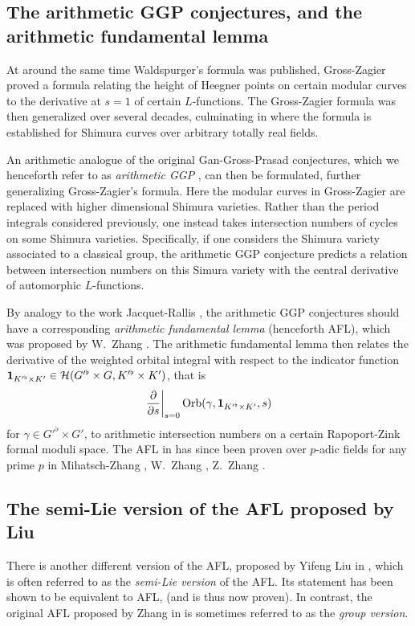 \subsection{The arithmetic GGP conjectures, and the arithmetic fundamental lemma}
At around the same time Waldspurger's formula was published,
Gross-Zagier \cite{ref:gross_zagier} proved a formula
relating the height of Heegner points
on certain modular curves to the derivative at $s=1$ of certain $L$-functions.
The Gross-Zagier formula was then generalized over several decades,
culminating in \cite{ref:GZshimura} where the formula is established
for Shimura curves over arbitrary totally real fields.

An arithmetic analogue of the original Gan-Gross-Prasad conjectures,
which we henceforth refer to as \emph{arithmetic GGP} \cite{ref:GGP},
can then be formulated, further generalizing Gross-Zagier's formula.
Here the modular curves in Gross-Zagier
are replaced with higher dimensional Shimura varieties.
Rather than the period integrals considered previously,
one instead takes intersection numbers of cycles on some Shimura varieties.
Specifically, if one considers the Shimura variety associated to a classical group,
the arithmetic GGP conjecture predicts a relation between intersection numbers
on this Simura variety with the central derivative of automorphic $L$-functions.

By analogy to the work Jacquet-Rallis \cite{ref:JR},
the arithmetic GGP conjectures should have a corresponding
\emph{arithmetic fundamental lemma} (henceforth AFL),
which was proposed by W.\ Zhang \cite[Conjecture 2.9]{ref:AFL}.
The arithmetic fundamental lemma then relates the derivative
of the weighted orbital integral with respect to the indicator function
$\mathbf{1}_{K'^\flat \times K'} \in \mathcal H(G'^\flat \times G, K'^\flat \times K')$, that is
\[ \left. \pdv{}{s} \right\rvert_{s=0} \operatorname{Orb}(\gamma, \mathbf{1}_{K'^\flat \times K'}, s) \]
for $\gamma \in G'^\flat \times G'$,
to arithmetic intersection numbers on a certain Rapoport-Zink formal moduli space.
The AFL in \cite{ref:AFL} has since been proven over $p$-adic fields for any prime $p$ in
Mihatsch-Zhang \cite{ref:MZ2021}, W.\ Zhang \cite{ref:Wei2021}, Z.\ Zhang \cite{ref:Zhiyu}.

\subsection{The semi-Lie version of the AFL proposed by Liu}
There is another different version of the AFL, proposed by Yifeng Liu in
\cite[Conjecture 1.12]{ref:liuFJ},
which is often referred to as the \emph{semi-Lie version} of the AFL.
Its statement has been shown to be equivalent to AFL,
\cite[Remark 1.13]{ref:liuFJ} (and is thus now proven).
In contrast, the original AFL proposed by Zhang in \cite[Conjecture 2.9]{ref:AFL}
is sometimes referred to as the \emph{group version}.

